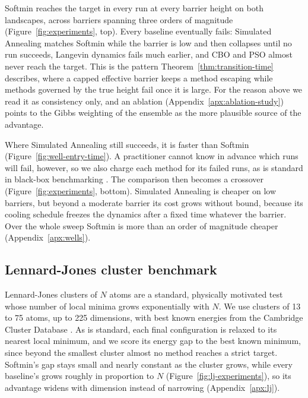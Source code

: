 \documentclass{article} %
\theoremstyle{plain}
\theoremstyle{definition}
\theoremstyle{remark}
\begin{document}
Softmin reaches the target in every run at every barrier height on both landscapes, across barriers spanning three orders of magnitude (Figure~\ref{fig:experiments}, top). Every baseline eventually fails: Simulated Annealing matches Softmin while the barrier is low and then collapses until no run succeeds, Langevin dynamics fails much earlier, and CBO and PSO almost never reach the target. This is the pattern Theorem~\ref{thm:transition-time} describes, where a capped effective barrier keeps a method escaping while methods governed by the true height fail once it is large. For the reason above we read it as consistency only, and an ablation (Appendix~\ref{apx:ablation-study}) points to the Gibbs weighting of the ensemble as the more plausible source of the advantage.

Where Simulated Annealing still succeeds, it is faster than Softmin (Figure~\ref{fig:well-entry-time}). A practitioner cannot know in advance which runs will fail, however, so we also charge each method for its failed runs, as is standard in black-box benchmarking \citep{hansen2016coco}. The comparison then becomes a crossover (Figure~\ref{fig:experiments}, bottom). Simulated Annealing is cheaper on low barriers, but beyond a moderate barrier its cost grows without bound, because its cooling schedule freezes the dynamics after a fixed time whatever the barrier. Over the whole sweep Softmin is more than an order of magnitude cheaper (Appendix~\ref{apx:wells}).

\subsection{Lennard-Jones cluster benchmark}
\label{sec:lj-benchmark}

Lennard-Jones clusters of $N$ atoms \citep{jones1924determination} are a standard, physically motivated test whose number of local minima grows exponentially with $N$. We use clusters of 13 to 75 atoms, up to 225 dimensions, with best known energies from the Cambridge Cluster Database \citep{wales1997global}. As is standard, each final configuration is relaxed to its nearest local minimum, and we score its energy gap to the best known minimum, since beyond the smallest cluster almost no method reaches a strict target. Softmin's gap stays small and nearly constant as the cluster grows, while every baseline's grows roughly in proportion to $N$ (Figure~\ref{fig:lj-experiments}), so its advantage widens with dimension instead of narrowing (Appendix~\ref{apx:lj}).
\end{document}
